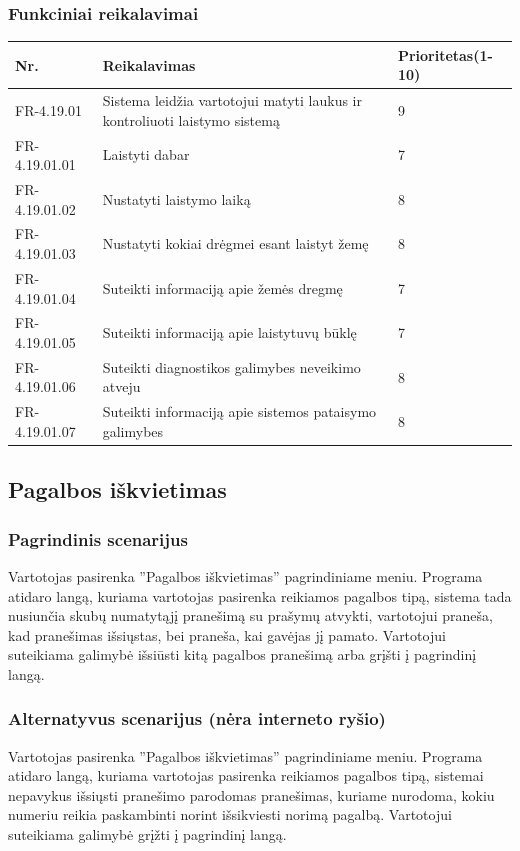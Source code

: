 \documentclass[oneside]{VUMIFPSkursinis}
\begin{document}
	\subsubsection{Funkciniai reikalavimai}
\begin{table}[htbp]
	\begin{tabularx}{1\textwidth}{ |P{2.5cm}|X|P{3cm }| } \hline
		Nr. & Reikalavimas & Prioritetas(1-10) \\ \hline
		FR-4.19.01 & Sistema leidžia vartotojui matyti laukus ir kontroliuoti laistymo sistemą & 9 \\ \hline
		FR-4.19.01.01 & Laistyti dabar & 7 \\ \hline
		FR-4.19.01.02 & Nustatyti laistymo laiką & 8\\ \hline
		FR-4.19.01.03 & Nustatyti kokiai drėgmei esant laistyt žemę & 8 \\ \hline
		FR-4.19.01.04 & Suteikti informaciją apie žemės dregmę & 7 \\ \hline
		FR-4.19.01.05 & Suteikti informaciją apie laistytuvų būklę & 7 \\ \hline
		FR-4.19.01.06 & Suteikti diagnostikos galimybes neveikimo atveju & 8 \\ \hline
		FR-4.19.01.07 & Suteikti informaciją apie sistemos pataisymo galimybes & 8 \\ \hline
	\end{tabularx}
\end{table}
\subsection{Pagalbos iškvietimas}
	\subsubsection{Pagrindinis scenarijus}
	Vartotojas pasirenka ''Pagalbos iškvietimas'' pagrindiniame meniu. Programa atidaro langą, kuriama vartotojas pasirenka reikiamos pagalbos tipą, sistema tada nusiunčia skubų numatytąjį pranešimą su prašymų atvykti, vartotojui praneša, kad pranešimas išsiųstas, bei praneša, kai gavėjas jį pamato. Vartotojui suteikiama galimybė išsiūsti kitą pagalbos pranešimą arba grįšti į pagrindinį langą.
	\subsubsection{Alternatyvus scenarijus (nėra interneto ryšio)}
	Vartotojas pasirenka ''Pagalbos iškvietimas'' pagrindiniame meniu. Programa atidaro langą, kuriama vartotojas pasirenka reikiamos pagalbos tipą, sistemai nepavykus išsiųsti pranešimo parodomas pranešimas, kuriame nurodoma, kokiu numeriu reikia paskambinti norint išsikviesti norimą pagalbą. Vartotojui suteikiama galimybė grįžti į pagrindinį langą.
\pagebreak
\end{document}
